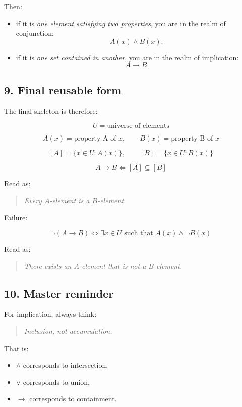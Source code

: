 \documentclass{article}
\begin{document}
	Then:
	
	\begin{itemize}
		\item if it is \emph{one element satisfying two properties}, you are in the realm of conjunction:
		\[
		A(x)\land B(x);
		\]
		\item if it is \emph{one set contained in another}, you are in the realm of implication:
		\[
		A \to B.
		\]
	\end{itemize}
	
	\subsection*{9. Final reusable form}
	The final skeleton is therefore:
	
	\[
	U=\text{universe of elements}
	\]
	
	\[
	A(x)=\text{property A of }x,
	\qquad
	B(x)=\text{property B of }x
	\]
	
	\[
	[A]=\{x\in U:A(x)\},
	\qquad
	[B]=\{x\in U:B(x)\}
	\]
	
	\[
	A\to B
	\iff
	[A]\subseteq[B]
	\]
	
	\noindent
	Read as:
	
	\begin{quote}
		\emph{Every \(A\)-element is a \(B\)-element.}
	\end{quote}
	
	Failure:
	
	\[
	\neg(A\to B)
	\iff
	\exists x\in U \text{ such that } A(x)\land \neg B(x)
	\]
	
	\noindent
	Read as:
	
	\begin{quote}
		\emph{There exists an \(A\)-element that is not a \(B\)-element.}
	\end{quote}
	
	\subsection*{10. Master reminder}
	For implication, always think:
	
	\begin{quote}
		\emph{Inclusion, not accumulation.}
	\end{quote}
	
	That is:
	
	\begin{itemize}
		\item \(\land\) corresponds to intersection,
		\item \(\lor\) corresponds to union,
		\item \(\to\) corresponds to containment.
	\end{itemize}
	
\end{document}
